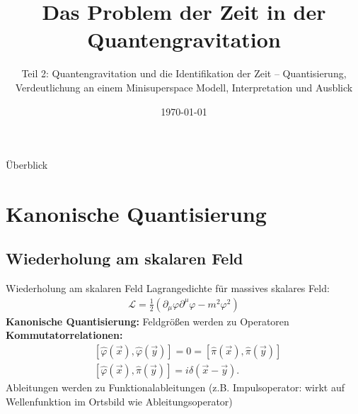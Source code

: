 \documentclass[mathserif]{beamer}
\title{\textbf{Das Problem der Zeit in der Quantengravitation}}
\author{\small {Teil 2: Quantengravitation und die Identifikation der Zeit -- Quantisierung, Verdeutlichung an einem Minisuperspace Modell, Interpretation und Ausblick}}
\institute{}
\date{\today}
\theoremstyle{definition}
\begin{document}
	\begin{frame}
		\titlepage
	\end{frame}

	\begin{frame}{Überblick}
		\tableofcontents
	\end{frame}

\section{Kanonische Quantisierung}
\subsection{Wiederholung am skalaren Feld}
	\begin{frame}{Wiederholung am skalaren Feld}
		Lagrangedichte für massives skalares Feld:
		\begin{align}
			\mathcal{L}=\frac{1}{2}(\partial_\mu\varphi \partial^\mu\varphi-m^2\varphi^2)
		\end{align}
		\pause
		\textbf{Kanonische Quantisierung:} Feldgrößen werden zu Operatoren\\
		\pause
		\textbf{Kommutatorrelationen:}
		\begin{align}
			&[\hat{\varphi}(\vec{x}), \hat{\varphi}(\vec{y})]=0=[\hat{\pi}(\vec{x}), \hat{\pi}(\vec{y})] \\
			&[\hat{\varphi}(\vec{x}), \hat{\pi}(\vec{y})]=i\delta(\vec{x}-\vec{y}).
		\end{align}
		Ableitungen werden zu Funktionalableitungen (z.B. Impulsoperator: wirkt auf Wellenfunktion im Ortsbild wie Ableitungsoperator)
	\end{frame}
\end{document}

